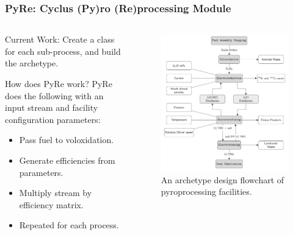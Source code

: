 \begin{frame}
\frametitle{PyRe: Cyclus (Py)ro (Re)processing Module}
\begin{columns}
	\begin{column}{.45\textwidth}
		\begin{block}{Current Work:} 
		Create a class for each sub-process, and build the archetype. 
		\end{block}
		\begin{block}{How does PyRe work?} 
		PyRe does the following with an input stream and facility configuration parameters: 
		\begin{itemize}
			\item Pass fuel to voloxidation.
			\item Generate efficiencies from parameters.
			\item Multiply stream by efficiency matrix.
			\item Repeated for each process.
		\end{itemize}
		\end{block}
	\end{column}
	\begin{column}{.55\textwidth}
		\begin{figure}
			\centering
			\includegraphics[width=0.9\linewidth]{flowchart}
			\caption{An archetype design flowchart of pyroprocessing facilities.}
			\label{fig:pyre}
		\end{figure}
	\end{column}
\end{columns} 
\end{frame}

